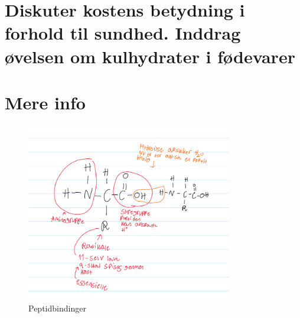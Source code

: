 \section{Diskuter kostens betydning i forhold til sundhed. Inddrag øvelsen om kulhydrater i fødevarer}
\section{Mere info}
\begin{figure}
    \centering
    \includegraphics[width=0.8\textwidth]{figurs/peptidbindinger.png}
    \caption{Peptidbindinger}
    \label{fig:peptidbindinger}
\end{figure}